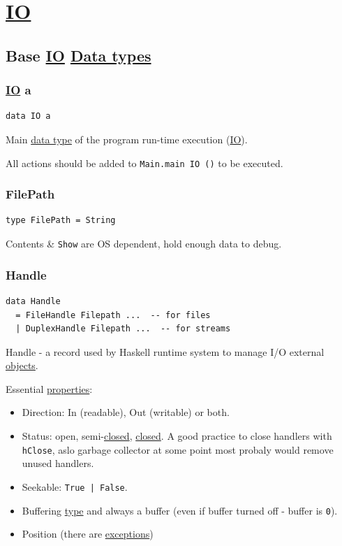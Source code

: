 \documentclass[a4paper,14pt,oneside]{book}
\begin{document}
\chapter{\hyperref[org3c23801]{IO}}
\label{sec:org27e47d9}

\section{Base \hyperref[org3c23801]{IO} \hyperref[org7d4ea11]{Data types}}
\label{sec:orgd172a9b}
\subsection{\hyperref[org3c23801]{IO} a}
\label{sec:org84dfc92}

\begin{verbatim}
data IO a
\end{verbatim}

Main \hyperref[org54f2079]{data type} of the program run-time execution (\hyperref[org3c23801]{IO}).

All actions should be added to \texttt{Main.main IO ()} to be executed.

\subsection{FilePath}
\label{sec:org86cd22d}

\begin{verbatim}
type FilePath = String
\end{verbatim}

Contents \& \texttt{Show} are OS dependent, hold enough data to debug.

\subsection{Handle}
\label{sec:org460cf90}

\begin{verbatim}
data Handle
  = FileHandle Filepath ...  -- for files
  | DuplexHandle Filepath ...  -- for streams
\end{verbatim}

Handle - a record used by Haskell runtime system to manage I/O external \hyperref[org176276a]{objects}.

Essential \hyperref[org8cc685d]{properties}:

\begin{itemize}
\item Direction: In (readable), Out (writable) or both.
\item Status: open, semi-\hyperref[org2fc158d]{closed}, \hyperref[org2fc158d]{closed}.
A good practice to close handlers with \texttt{hClose}, aslo garbage collector at some point most probaly would remove unused handlers.
\item Seekable: \texttt{True | False}.
\item Buffering \hyperref[org4e3af4c]{type} and always a buffer (even if buffer turned off - buffer is \texttt{0}).
\item Position (there are \hyperref[orgd719405]{exceptions})
\end{itemize}
\end{document}
